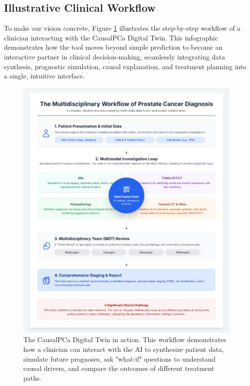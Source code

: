 \documentclass[11pt, a4paper]{article}
\begin{document}
\subsection{Illustrative Clinical Workflow}
To make our vision concrete, Figure \ref{fig:workflow} illustrates the step-by-step workflow of a clinician interacting with the CausalPCa Digital Twin. This infographic demonstrates how the tool moves beyond simple prediction to become an interactive partner in clinical decision-making, seamlessly integrating data synthesis, prognostic simulation, causal explanation, and treatment planning into a single, intuitive interface.

\begin{figure}[H]
    \centering
    \includegraphics[width=\textwidth]{wf.png}
    \caption{The CausalPCa Digital Twin in action. This workflow demonstrates how a clinician can interact with the AI to synthesize patient data, simulate future prognoses, ask "what-if" questions to understand causal drivers, and compare the outcomes of different treatment paths.}
    \label{fig:workflow}
\end{figure}
\end{document}
